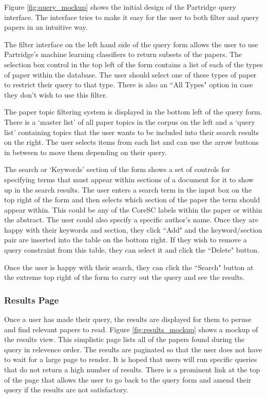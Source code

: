 Figure \ref{fig:query_mockup} shows the initial design of the Partridge query
interface. The interface tries to make it easy for the user to both filter and
query papers in an intuitive way.

The filter interface on the left hand side of the query form allows the user to
use Partridge's machine learning classifiers to return subsets of the papers.
The selection box control in the top left of the form contains a list of each
of the types of paper within the database. The user should select one of these
types of paper to restrict their query to that type. There is also an ``All
Types" option in case they don't wish to use this filter.

The paper topic filtering system is displayed in the bottom left of the query
form. There is a `master list' of all paper topics in the corpus on the left
and a `query list' containing topics that the user wants to be included into
their search results on the right. The user selects items from each list and
can use the arrow buttons in between to move them depending on their query.

The search or `Keywords' section of the form shows a set of controls for
specifying terms that must appear within sections of a document for it to show
up in the search results. The user enters a search term in the input box on the
top right of the form and then selects which section of the paper the term
should appear within. This could be any of the CoreSC labels within the paper or
within the abstract. The user could also specify a specific author's name. Once
they are happy with their keywords and section, they click ``Add" and the
keyword/section pair are inserted into the table on the bottom right. If they
wish to remove a query constraint from this table, they can select it and click
the ``Delete" button. 

Once the user is happy with their search, they can click the ``Search" button
at the extreme top right of the form to carry out the query and see the
results.

\subsubsection{ Results Page }

Once a user has made their query, the results are displayed for them to peruse
and find relevant papers to read. Figure \ref{fig:results_mockup} shows a
mockup of the results view. This simplistic page lists all of the papers found
during the query in relevence order. The results are paginated so that the user
does not have to wait for a large page to render. It is hoped that users will
run specific queries that do not return a high number of results. There is a
prominent link at the top of the page that allows the user to go back to the
query form and amend their query if the results are not satisfactory.

